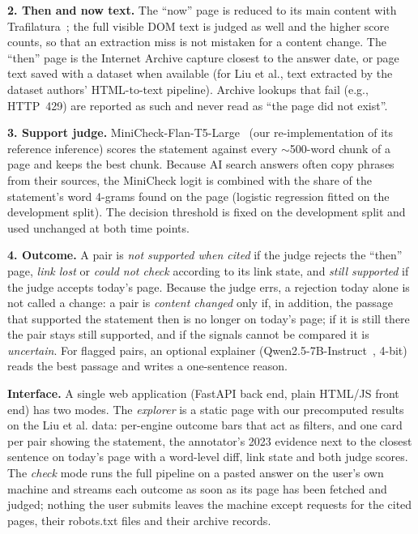 \textbf{2. Then and now text.} The ``now'' page is reduced to its main content with Trafilatura~\cite{Barbaresi_2021}; the full visible DOM text is judged as well and the higher score counts, so that an extraction miss is not mistaken for a content change. The ``then'' page is the Internet Archive capture closest to the answer date, or page text saved with a dataset when available (for Liu et al., text extracted by the dataset authors' HTML-to-text pipeline). Archive lookups that fail (e.g., HTTP~429) are reported as such and never read as ``the page did not exist''.

\textbf{3. Support judge.} MiniCheck-Flan-T5-Large~\cite{Tang_2024} (our re-implementation of its reference inference) scores the statement against every $\sim$500-word chunk of a page and keeps the best chunk. Because AI search answers often copy phrases from their sources, the MiniCheck logit is combined with the share of the statement's word 4-grams found on the page (logistic regression fitted on the development split). The decision threshold is fixed on the development split and used unchanged at both time points.

\textbf{4. Outcome.} A pair is \emph{not supported when cited} if the judge rejects the ``then'' page, \emph{link lost} or \emph{could not check} according to its link state, and \emph{still supported} if the judge accepts today's page. Because the judge errs, a rejection today alone is not called a change: a pair is \emph{content changed} only if, in addition, the passage that supported the statement then is no longer on today's page; if it is still there the pair stays still supported, and if the signals cannot be compared it is \emph{uncertain}. For flagged pairs, an optional explainer (Qwen2.5-7B-Instruct~\cite{qwen2025qwen25technicalreport}, 4-bit) reads the best passage and writes a one-sentence reason.

\textbf{Interface.} A single web application (FastAPI back end, plain HTML/JS front end) has two modes. The \emph{explorer} is a static page with our precomputed results on the Liu et al. data: per-engine outcome bars that act as filters, and one card per pair showing the statement, the annotator's 2023 evidence next to the closest sentence on today's page with a word-level diff, link state and both judge scores. The \emph{check} mode runs the full pipeline on a pasted answer on the user's own machine and streams each outcome as soon as its page has been fetched and judged; nothing the user submits leaves the machine except requests for the cited pages, their robots.txt files and their archive records.
